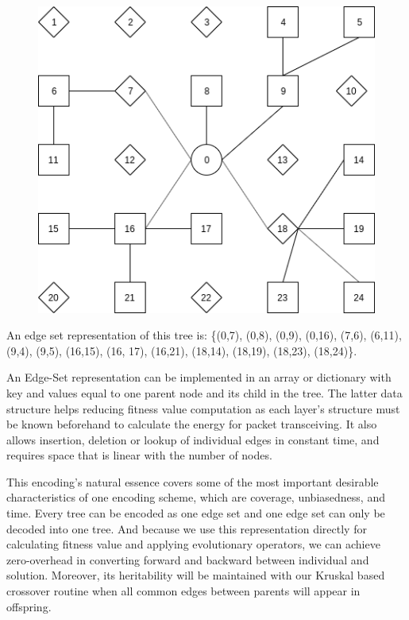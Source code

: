 
\begin{figure}
	\centering
	\includegraphics[scale=0.4]{Images/EdgeSetRepresentation}
\end{figure}

An edge set representation of this tree is: \{(0,7), (0,8), (0,9), (0,16), (7,6), (6,11), (9,4), (9,5), (16,15), (16, 17), (16,21), (18,14), (18,19), (18,23), (18,24)\}.

An Edge-Set representation can be implemented in an array or dictionary with key and values equal to one parent node and its child in the tree. The latter data structure helps reducing fitness value computation as each layer’s structure must be known beforehand to calculate the energy for packet transceiving. It also allows insertion, deletion or lookup of individual edges in constant time, and requires space that is linear with the number of nodes.

This encoding’s natural essence covers some of the most important desirable characteristics of one encoding scheme, which are coverage, unbiasedness, and time. Every tree can be encoded as one edge set and one edge set can only be decoded into one tree. And because we use this representation directly for calculating fitness value and applying evolutionary operators, we can achieve zero-overhead in converting forward and backward between individual and solution. Moreover, its heritability will be maintained with our Kruskal based crossover routine when all common edges between parents will appear in offspring.

